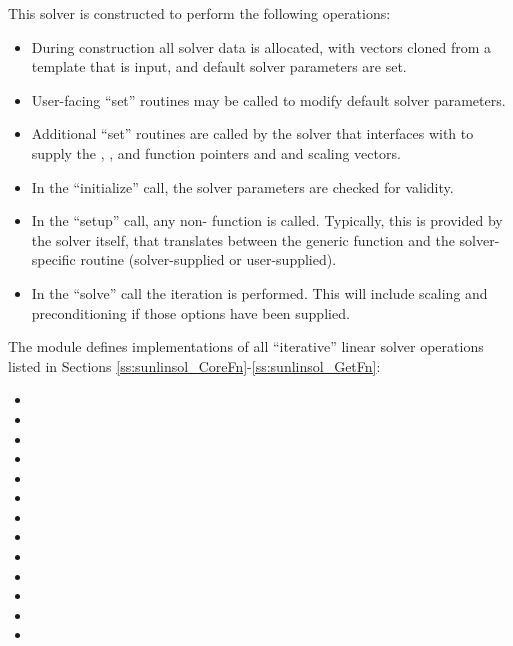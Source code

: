 This solver is constructed to perform the following operations:
\begin{itemize}
\item During construction all {\nvector} solver data is allocated,
  with vectors cloned from a template {\nvector} that is input, and
  default solver parameters are set.
\item User-facing ``set'' routines may be called to modify default
  solver parameters.
\item Additional ``set'' routines are called by the {\sundials} solver
  that interfaces with {\sunlinsolspbcgs} to supply the
  , , and  function pointers and
   and  scaling vectors.
\item In the ``initialize'' call, the solver parameters are checked
  for validity.
\item In the ``setup'' call, any non-
   function is called.  Typically, this is provided by
  the {\sundials} solver itself, that translates between the
  generic  function and the
  solver-specific routine (solver-supplied or user-supplied).
\item In the ``solve'' call the {\spbcg} iteration is performed.  This
  will include scaling and preconditioning if those options have been
  supplied.
\end{itemize}


\noindent The {\sunlinsolspbcgs} module defines implementations of all
``iterative'' linear solver operations listed in Sections
\ref{ss:sunlinsol_CoreFn}-\ref{ss:sunlinsol_GetFn}:
\begin{itemize}
\item {}
\item {}
\item {}
\item {}
\item {}
\item {}
\item {}
\item {}
\item {}
\item {}
\item {}
\item {}
\item {}
\end{itemize}
